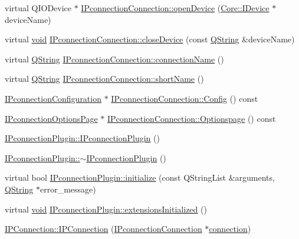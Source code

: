 \begin{DoxyCompactItemize}
virtual \-Q\-I\-O\-Device $\ast$ \hyperlink{group___i_p_conn_plugin_ga111b86b5f5905dee93d220a847614bed}{\-I\-Pconnection\-Connection\-::open\-Device} (\hyperlink{class_core_1_1_i_device}{\-Core\-::\-I\-Device} $\ast$device\-Name)
\item 
virtual \hyperlink{group___u_a_v_objects_plugin_ga444cf2ff3f0ecbe028adce838d373f5c}{void} \hyperlink{group___i_p_conn_plugin_gab576cdaa8af931b52cafea033a9c7350}{\-I\-Pconnection\-Connection\-::close\-Device} (const \hyperlink{group___u_a_v_objects_plugin_gab9d252f49c333c94a72f97ce3105a32d}{\-Q\-String} \&device\-Name)
\item 
virtual \hyperlink{group___u_a_v_objects_plugin_gab9d252f49c333c94a72f97ce3105a32d}{\-Q\-String} \hyperlink{group___i_p_conn_plugin_ga8709e871725c0d119edddd54db4c505c}{\-I\-Pconnection\-Connection\-::connection\-Name} ()
\item 
virtual \hyperlink{group___u_a_v_objects_plugin_gab9d252f49c333c94a72f97ce3105a32d}{\-Q\-String} \hyperlink{group___i_p_conn_plugin_gae18fe74813c61e299c3492ea3ac616c5}{\-I\-Pconnection\-Connection\-::short\-Name} ()
\item 
\hyperlink{class_i_pconnection_configuration}{\-I\-Pconnection\-Configuration} $\ast$ \hyperlink{group___i_p_conn_plugin_ga0e41970926f79a5f86cd89fe61075e03}{\-I\-Pconnection\-Connection\-::\-Config} () const 
\item 
\hyperlink{class_i_pconnection_options_page}{\-I\-Pconnection\-Options\-Page} $\ast$ \hyperlink{group___i_p_conn_plugin_ga8d119fd704cfcdca9ae8dc6c3a3c237b}{\-I\-Pconnection\-Connection\-::\-Optionspage} () const 
\item 
\hyperlink{group___i_p_conn_plugin_ga49199ecbe02c9b8fec0c2e0b1003d8ef}{\-I\-Pconnection\-Plugin\-::\-I\-Pconnection\-Plugin} ()
\item 
\hyperlink{group___i_p_conn_plugin_gad46085821e644ad2a37cf2b6f79d0883}{\-I\-Pconnection\-Plugin\-::$\sim$\-I\-Pconnection\-Plugin} ()
\item 
virtual bool \hyperlink{group___i_p_conn_plugin_ga66ca8127b859071b5c905aa9d0c22c55}{\-I\-Pconnection\-Plugin\-::initialize} (const \-Q\-String\-List \&arguments, \hyperlink{group___u_a_v_objects_plugin_gab9d252f49c333c94a72f97ce3105a32d}{\-Q\-String} $\ast$error\-\_\-message)
\item 
virtual \hyperlink{group___u_a_v_objects_plugin_ga444cf2ff3f0ecbe028adce838d373f5c}{void} \hyperlink{group___i_p_conn_plugin_ga61e1d618e2d1914fd8190687cf0017a5}{\-I\-Pconnection\-Plugin\-::extensions\-Initialized} ()
\item 
\hyperlink{group___i_p_conn_plugin_gac181aa5d3b59b0fab84380bea813691c}{\-I\-P\-Connection\-::\-I\-P\-Connection} (\hyperlink{class_i_pconnection_connection}{\-I\-Pconnection\-Connection} $\ast$\hyperlink{group___i_p_conn_plugin_ga75cb9b33b52928c030806876f2c2f439}{connection})
\end{DoxyCompactItemize}
